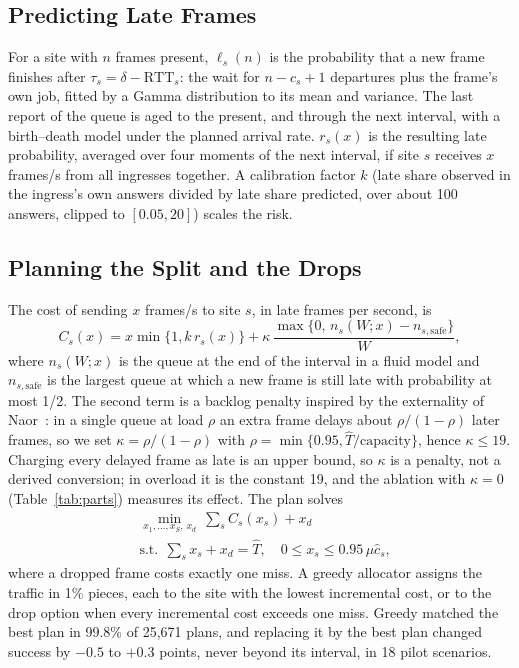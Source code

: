 \documentclass[conference]{IEEEtran}
\newcommand{\That}{\hat{T}}
\begin{document}
\subsection{Predicting Late Frames}
For a site with $n$ frames present, $\ell_s(n)$ is the probability that a new frame finishes after $\tau_s = \delta - \mathrm{RTT}_s$: the wait for $n - c_s + 1$ departures plus the frame's own job, fitted by a Gamma distribution to its mean and variance. The last report of the queue is aged to the present, and through the next interval, with a birth--death model under the planned arrival rate. $r_s(x)$ is the resulting late probability, averaged over four moments of the next interval, if site $s$ receives $x$ frames/s from all ingresses together. A calibration factor $k$ (late share observed in the ingress's own answers divided by late share predicted, over about 100 answers, clipped to $[0.05, 20]$) scales the risk.

\subsection{Planning the Split and the Drops}\label{sec:plan}
The cost of sending $x$ frames/s to site $s$, in late frames per second, is
\begin{equation}
C_s(x) = x\min\{1, k\,r_s(x)\} + \kappa\,\frac{\max\{0,\, n_s(W;x) - n_{s,\mathrm{safe}}\}}{W},
\label{eq:cost}
\end{equation}
where $n_s(W;x)$ is the queue at the end of the interval in a fluid model and $n_{s,\mathrm{safe}}$ is the largest queue at which a new frame is still late with probability at most 1/2. The second term is a backlog penalty inspired by the externality of Naor~\cite{naor}: in a single queue at load $\rho$ an extra frame delays about $\rho/(1-\rho)$ later frames, so we set $\kappa = \rho/(1-\rho)$ with $\rho = \min\{0.95, \That/\text{capacity}\}$, hence $\kappa \le 19$. Charging every delayed frame as late is an upper bound, so $\kappa$ is a penalty, not a derived conversion; in overload it is the constant 19, and the ablation with $\kappa = 0$ (Table~\ref{tab:parts}) measures its effect. The plan solves
\begin{equation}
\begin{aligned}
&\min_{x_1,\dots,x_S,\,x_d} \ \sum_s C_s(x_s) + x_d\\
&\text{s.t.}\ \ \sum_s x_s + x_d = \That,\quad 0 \le x_s \le 0.95\,\mu\hat c_s,
\end{aligned}
\label{eq:plan}
\end{equation}
where a dropped frame costs exactly one miss. A greedy allocator assigns the traffic in 1\% pieces, each to the site with the lowest incremental cost, or to the drop option when every incremental cost exceeds one miss. Greedy matched the best plan in 99.8\% of 25,671 plans, and replacing it by the best plan changed success by $-0.5$ to $+0.3$ points, never beyond its interval, in 18 pilot scenarios.
\end{document}
